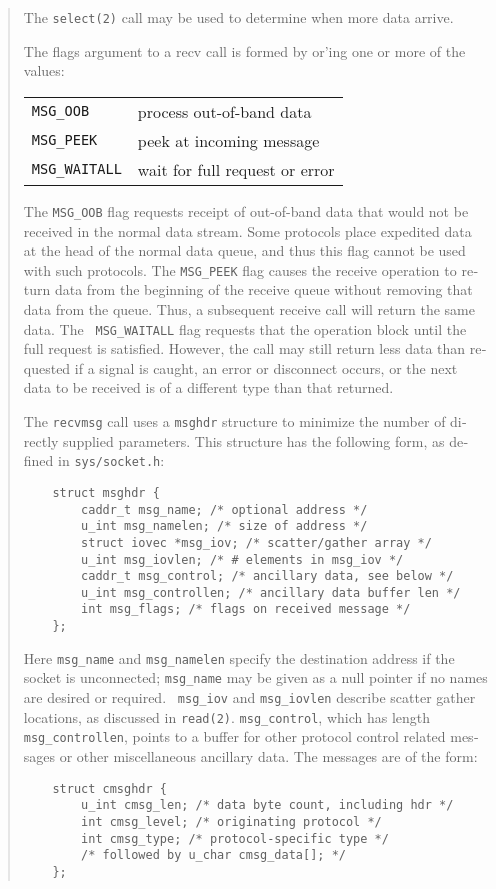 \begin{appendix}
\begin{english}
\begin{quote}
	The {\tt select(2)} call may be used to determine when more data
	arrive.

 	The flags argument to a recv call is formed by or'ing one
 	or more of the values:\\
	\begin{tabular}{lp{8cm}}
		{\tt MSG\_OOB}	&
			process out-of-band data\\
		{\tt MSG\_PEEK}	&
			peek at incoming message\\
		{\tt MSG\_WAITALL}	&
			wait for full request or error
	\end{tabular}

	The {\tt MSG\_OOB} flag requests receipt of out-of-band data that
	would not be received in the normal data stream. Some protocols
	place expedited data at the head of the normal data queue, and thus
	this flag cannot be used with such protocols. The {\tt MSG\_PEEK}
	flag causes the receive operation to return data from the beginning
	of the receive queue without removing that data from the queue.
	Thus, a subsequent receive call will return the same data. The {\tt
	MSG\_WAITALL} flag requests that the operation block until the full
	request is satisfied. However, the call may still return less data
	than requested if a signal is caught, an error or disconnect occurs,
	or the next data to be received is of a different type than that
	returned.

	The {\tt recvmsg} call uses a {\tt msghdr} structure to minimize the
	number of directly supplied parameters. This structure has the
	following form, as defined in {\tt sys/socket.h}:
	\begin{verbatim}
	struct msghdr {
	    caddr_t msg_name; /* optional address */
	    u_int msg_namelen; /* size of address */
	    struct iovec *msg_iov; /* scatter/gather array */
	    u_int msg_iovlen; /* # elements in msg_iov */
	    caddr_t msg_control; /* ancillary data, see below */
	    u_int msg_controllen; /* ancillary data buffer len */
	    int msg_flags; /* flags on received message */
	};
	\end{verbatim}

	Here {\tt msg\_name} and {\tt msg\_namelen} specify the destination
	address if the socket is unconnected; {\tt msg\_name} may be given
	as a null pointer if no names are desired or required. {\tt
	msg\_iov} and {\tt msg\_iovlen} describe scatter gather locations,
	as discussed in {\tt read(2)}. {\tt msg\_control}, which has length
	{\tt msg\_controllen}, points to a buffer for other protocol control
	related messages or other miscellaneous ancillary data. The messages
	are of the form:\\
	\begin{verbatim}
	struct cmsghdr {
	    u_int cmsg_len; /* data byte count, including hdr */
	    int cmsg_level; /* originating protocol */
	    int cmsg_type; /* protocol-specific type */
	    /* followed by u_char cmsg_data[]; */
	};
	\end{verbatim}


\end{quote}
\end{english}
\end{appendix}
